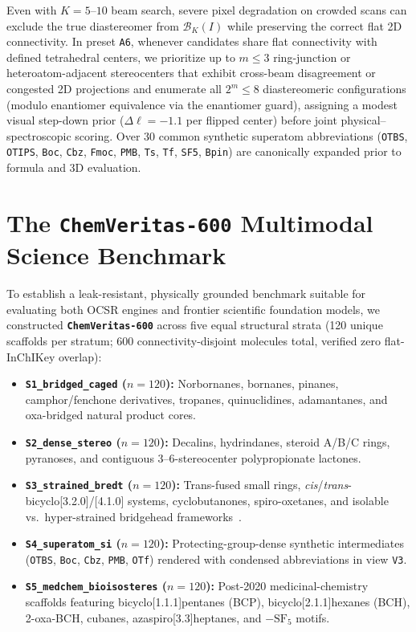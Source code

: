 \documentclass[10pt,twocolumn]{article}
\begin{document}
Even with $K=5$--$10$ beam search, severe pixel degradation on crowded scans can exclude the true diastereomer from $\mathcal{B}_K(I)$ while preserving the correct flat 2D connectivity. In preset \texttt{A6}, whenever candidates share flat connectivity with defined tetrahedral centers, we prioritize up to $m \le 3$ ring-junction or heteroatom-adjacent stereocenters that exhibit cross-beam disagreement or congested 2D projections and enumerate all $2^m \le 8$ diastereomeric configurations (modulo enantiomer equivalence via the enantiomer guard), assigning a modest visual step-down prior ($\Delta \ell = -1.1$ per flipped center) before joint physical--spectroscopic scoring. Over 30 common synthetic superatom abbreviations (\texttt{OTBS}, \texttt{OTIPS}, \texttt{Boc}, \texttt{Cbz}, \texttt{Fmoc}, \texttt{PMB}, \texttt{Ts}, \texttt{Tf}, \texttt{SF5}, \texttt{Bpin}) are canonically expanded prior to formula and 3D evaluation.

\section{The \texttt{ChemVeritas-600} Multimodal Science Benchmark}
\label{sec:benchmark}

To establish a leak-resistant, physically grounded benchmark suitable for evaluating both OCSR engines and frontier scientific foundation models, we constructed \textbf{\texttt{ChemVeritas-600}} across five equal structural strata (120 unique scaffolds per stratum; 600 connectivity-disjoint molecules total, verified zero flat-InChIKey overlap):
\begin{itemize}
  \item \textbf{\texttt{S1\_bridged\_caged} ($n=120$):} Norbornanes, bornanes, pinanes, camphor/fenchone derivatives, tropanes, quinuclidines, adamantanes, and oxa-bridged natural product cores.
  \item \textbf{\texttt{S2\_dense\_stereo} ($n=120$):} Decalins, hydrindanes, steroid A/B/C rings, pyranoses, and contiguous 3--6-stereocenter polypropionate lactones.
  \item \textbf{\texttt{S3\_strained\_bredt} ($n=120$):} Trans-fused small rings, \emph{cis}/\emph{trans}-bicyclo[3.2.0]/[4.1.0] systems, cyclobutanones, spiro-oxetanes, and isolable vs.\ hyper-strained bridgehead frameworks~\cite{McDermott2024AntiBredt}.
  \item \textbf{\texttt{S4\_superatom\_si} ($n=120$):} Protecting-group-dense synthetic intermediates (\texttt{OTBS}, \texttt{Boc}, \texttt{Cbz}, \texttt{PMB}, \texttt{OTf}) rendered with condensed abbreviations in view \texttt{V3}.
  \item \textbf{\texttt{S5\_medchem\_bioisosteres} ($n=120$):} Post-2020 medicinal-chemistry scaffolds featuring bicyclo[1.1.1]pentanes (BCP), bicyclo[2.1.1]hexanes (BCH), 2-oxa-BCH, cubanes, azaspiro[3.3]heptanes, and $-\text{SF}_5$ motifs.
\end{itemize}
\end{document}

